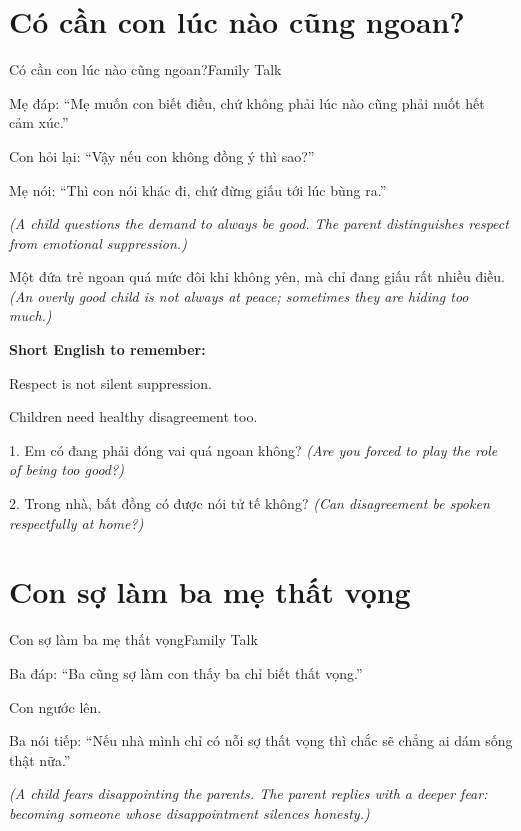 \section{Có cần con lúc nào cũng ngoan?}
\begin{truyen}{Có cần con lúc nào cũng ngoan?}{Family Talk}

Mẹ đáp: ``Mẹ muốn con biết điều, chứ không phải lúc nào cũng phải nuốt hết cảm xúc.''

Con hỏi lại: ``Vậy nếu con không đồng ý thì sao?''

Mẹ nói: ``Thì con nói khác đi, chứ đừng giấu tới lúc bùng ra.''

\textit{(A child questions the demand to always be good. The parent distinguishes respect from emotional suppression.)}
\end{truyen}

\begin{baihoc}
Một đứa trẻ ngoan quá mức đôi khi không yên, mà chỉ đang giấu rất nhiều điều.
\textit{(An overly good child is not always at peace; sometimes they are hiding too much.)}
\end{baihoc}

\begin{ghinhoanh}
\textbf{Short English to remember:}

Respect is not silent suppression.

Children need healthy disagreement too.
\end{ghinhoanh}

\begin{tuhocnhanh}
1. Em có đang phải đóng vai quá ngoan không? \textit{(Are you forced to play the role of being too good?)}

2. Trong nhà, bất đồng có được nói tử tế không? \textit{(Can disagreement be spoken respectfully at home?)}
\end{tuhocnhanh}
\ngancach

\section{Con sợ làm ba mẹ thất vọng}
\begin{truyen}{Con sợ làm ba mẹ thất vọng}{Family Talk}

Ba đáp: ``Ba cũng sợ làm con thấy ba chỉ biết thất vọng.''

Con ngước lên.

Ba nói tiếp: ``Nếu nhà mình chỉ có nỗi sợ thất vọng thì chắc sẽ chẳng ai dám sống thật nữa.''

\textit{(A child fears disappointing the parents. The parent replies with a deeper fear: becoming someone whose disappointment silences honesty.)}
\end{truyen}

